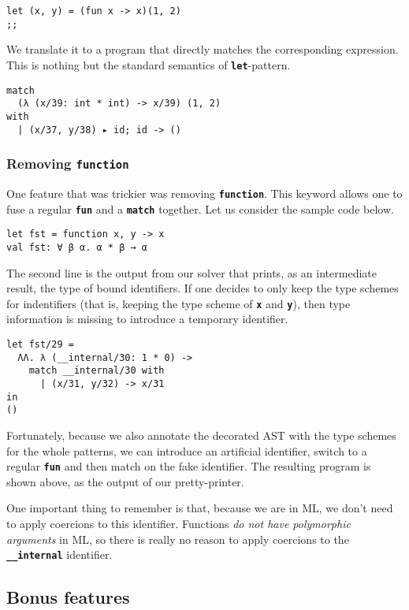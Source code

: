 \documentclass[10pt,a4paper,twoside,titlepage,twocolumn]{article}
\newcommand{\code}[1]{\textbf{\texttt{#1}}}
\begin{document}
\begin{verbatim}
let (x, y) = (fun x -> x)(1, 2)
;;
\end{verbatim}
We translate it to a program that directly matches the corresponding expression.
This is nothing but the standard semantics of \code{let}-pattern.
\begin{verbatim}
match
  (λ (x/39: int * int) -> x/39) (1, 2)
with
  | (x/37, y/38) ▸ id; id -> ()
\end{verbatim}

\subsubsection{Removing \code{function}}

One feature that was trickier was removing \code{function}. This keyword allows
one to fuse a regular \code{fun} and a \code{match} together. Let us consider
the sample code below.

\begin{verbatim}
let fst = function x, y -> x
val fst: ∀ β α. α * β → α
\end{verbatim}

The second line is the output from our solver that prints, as an intermediate
result, the type of bound identifiers. If one decides to only keep the type
schemes for indentifiers (that is, keeping the type scheme of \code{x} and
\code{y}), then type information is missing to introduce a temporary identifier.

\begin{verbatim}
let fst/29 =
  ΛΛ. λ (__internal/30: 1 * 0) -> 
    match __internal/30 with
      | (x/31, y/32) -> x/31
in
()
\end{verbatim}

Fortunately, because we also annotate the decorated AST with the type schemes
for the whole patterns, we can introduce an artificial identifier, switch to a
regular \code{fun} and then match on the fake identifier. The resulting program
is shown above, as the output of our pretty-printer.

One important thing to remember is that, because we are in ML, we don't need to
apply coercions to this identifier. Functions \emph{do not have polymorphic
arguments} in ML, so there is really no reason to apply coercions to the
\code{\_\_internal} identifier.

\subsection{Bonus features}
\end{document}
